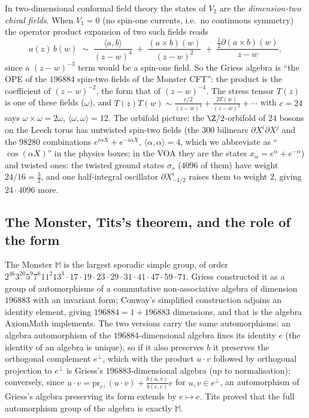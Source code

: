 \begin{physics}
In two-dimensional conformal field theory the states of $V_2$ are the \emph{dimension-two chiral
fields}.  When $V_1=0$ (no spin-one currents, i.e.\ no continuous symmetry) the operator product
expansion of two such fields reads
\begin{equation*}
  a(z)\,b(w)\;\sim\;\frac{\langle a,b\rangle}{(z-w)^4}\;+\;\frac{(a\times b)(w)}{(z-w)^2}
  \;+\;\frac{\tfrac12\partial(a\times b)(w)}{z-w},
\end{equation*}
since a $(z-w)^{-3}$ term would be a spin-one field.  So the Griess algebra is ``the OPE of the
$196884$ spin-two fields of the Monster CFT'': the product is the coefficient of $(z-w)^{-2}$, the form
that of $(z-w)^{-4}$.  The stress tensor $T(z)$ is one of these fields ($\omega$), and
$T(z)T(w)\sim\frac{c/2}{(z-w)^4}+\frac{2T(w)}{(z-w)^2}+\cdots$ with $c=24$ says $\omega\times\omega=2\omega$,
$\langle\omega,\omega\rangle=12$.  The orbifold picture: the $\Z/2$-orbifold of $24$ bosons on the Leech
torus has untwisted spin-two fields (the $300$ bilinears $\partial X^i\partial X^j$ and the $98280$
combinations $e^{i\alpha X}+e^{-i\alpha X}$, $\langle\alpha,\alpha\rangle=4$, which we abbreviate as
``$\cos(\alpha X)$'' in the physics boxes; in the VOA they are the states $x_\alpha=e^\alpha+e^{-\alpha}$) and
twisted ones: the twisted
ground states $\sigma_s$ ($4096$ of them) have weight $24/16=\tfrac32$, and one half-integral oscillator
$\partial X^i_{-1/2}$ raises them to weight $2$, giving $24\cdot4096$ more.
\end{physics}

\subsection{The Monster, Tits's theorem, and the role of the form}\label{ch21:sec:tits}

The Monster $\mathbb M$ is the largest sporadic simple group, of order
$2^{46}3^{20}5^{9}7^{6}11^2 13^3\cdot17\cdot19\cdot23\cdot29\cdot31\cdot41\cdot47\cdot59\cdot71$.  Griess
constructed it as a group of automorphisms of a commutative non-associative algebra of dimension
$196883$ with an invariant form; Conway's simplified construction adjoins an identity element, giving
$196884=1+196883$ dimensions, and that is the algebra AxiomMath implements.  The two versions carry the
same automorphisms: an algebra automorphism of the $196884$-dimensional algebra fixes its identity $e$
(the identity of an algebra is unique), so if it also preserves $b$ it preserves the orthogonal
complement $e^\perp$, which with the product $u\cdot v$ followed by orthogonal projection to $e^\perp$ is
Griess's $196883$-dimensional algebra (up to normalisation); conversely, since
$u\cdot v=\mathrm{pr}_{e^\perp}(u\cdot v)+\tfrac{b(u,v)}{b(e,e)}e$ for $u,v\in e^\perp$, an automorphism of
Griess's algebra preserving its form extends by $e\mapsto e$.  Tits proved that the full
automorphism group of the algebra is exactly $\mathbb M$.

